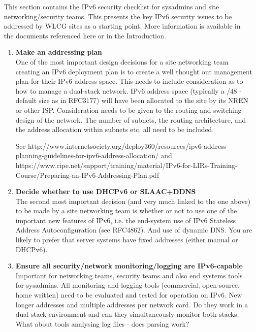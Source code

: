 
This section contains the IPv6 security checklist for sysadmins and site networking/security teams. This presents the key IPv6 security issues to be addressed by WLCG sites as a starting point. More information is available in the documents referenced here or in the Introduction. 



\begin{enumerate}


\item {\bf Make an addressing plan}\\
One of the most important design decisions for a site networking team creating an IPv6 deployment plan is to create a well thought out management plan for their IPv6 address space. This needs to include consideration as to how to manage a dual-stack network. IPv6 address space (typically a /48 - default size as in RFC3177) will have been allocated to the site by its NREN or other ISP. Consideration needs to be given to the routing and switching design of the network. The number of subnets, the routing architecture, and the address allocation within subnets etc. all need to be included. 

See http://www.internetsociety.org/deploy360/resources/ipv6-address-planning-guidelines-for-ipv6-address-allocation/   and https://www.ripe.net/support/training/material/IPv6-for-LIRs-Training-Course/Preparing-an-IPv6-Addressing-Plan.pdf  


\item {\bf Decide whether to use DHCPv6 or SLAAC+DDNS} \\
The second most important decision (and very much linked to the one above) to be made by a site networking team is whether or not to use one of the important new features of IPv6, i.e. the end-system use of  IPv6 Stateless Address Autoconfiguration (see RFC4862).  And use of dynamic DNS.  You are likely to prefer that server systems have fixed addresses (either manual or DHCPv6).



\item {\bf Ensure all security/network monitoring/logging are IPv6-capable}\\
Important for networking teams, security teams and also end systems tools for sysadmins. All monitoring and logging tools (commercial, open-source, home written) need to be evaluated and tested for operation on IPv6. New longer addresses and multiple addresses per network card. Do they work in a dual-stack environment and can they simultaneously monitor both stacks.  What about tools analysing log files - does parsing work?



\end{enumerate}
